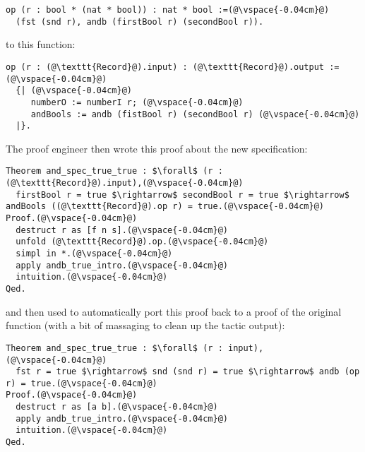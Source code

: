 \begin{lstlisting}
op (r : bool * (nat * bool)) : nat * bool :=(@\vspace{-0.04cm}@)
  (fst (snd r), andb (firstBool r) (secondBool r)).
\end{lstlisting}
to this function:

\begin{lstlisting}[backgroundcolor=\color{cyan!30}]
op (r : (@\texttt{Record}@).input) : (@\texttt{Record}@).output := (@\vspace{-0.04cm}@)
  {| (@\vspace{-0.04cm}@)
     numberO := numberI r; (@\vspace{-0.04cm}@)
     andBools := andb (fistBool r) (secondBool r) (@\vspace{-0.04cm}@)
  |}.
\end{lstlisting}
The proof engineer then wrote this proof about the new specification: %

\begin{lstlisting}
Theorem and_spec_true_true : $\forall$ (r : (@\texttt{Record}@).input),(@\vspace{-0.04cm}@)
  firstBool r = true $\rightarrow$ secondBool r = true $\rightarrow$ andBools ((@\texttt{Record}@).op r) = true.(@\vspace{-0.04cm}@)
Proof.(@\vspace{-0.04cm}@)
  destruct r as [f n s].(@\vspace{-0.04cm}@)
  unfold (@\texttt{Record}@).op.(@\vspace{-0.04cm}@)
  simpl in *.(@\vspace{-0.04cm}@)
  apply andb_true_intro.(@\vspace{-0.04cm}@)
  intuition.(@\vspace{-0.04cm}@)
Qed.
\end{lstlisting}
and then used \toolname to automatically port this proof back to a proof of the original function
(with a bit of massaging to clean up the tactic output): %

\begin{lstlisting}[backgroundcolor=\color{cyan!30}]
Theorem and_spec_true_true : $\forall$ (r : input),(@\vspace{-0.04cm}@)
  fst r = true $\rightarrow$ snd (snd r) = true $\rightarrow$ andb (op r) = true.(@\vspace{-0.04cm}@)
Proof.(@\vspace{-0.04cm}@)
  destruct r as [a b].(@\vspace{-0.04cm}@)
  apply andb_true_intro.(@\vspace{-0.04cm}@)
  intuition.(@\vspace{-0.04cm}@)
Qed.
\end{lstlisting}

